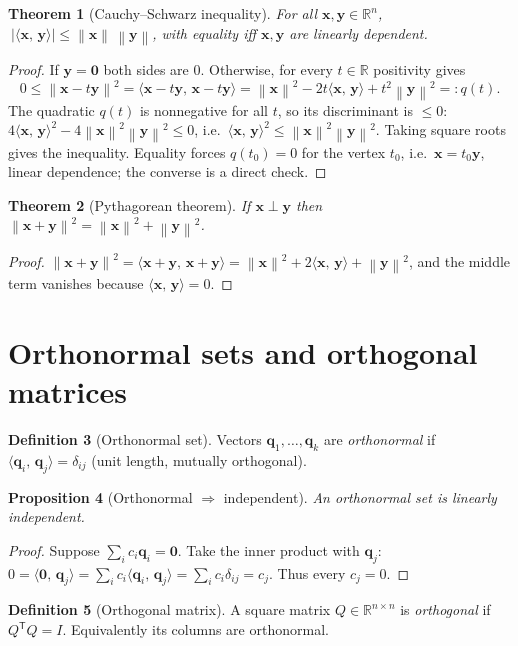 \documentclass[11pt,oneside]{book}
\theoremstyle{plain}
\newtheorem{theorem}{Theorem}[chapter]
\newtheorem{proposition}[theorem]{Proposition}
\theoremstyle{definition}
\newtheorem{definition}[theorem]{Definition}
\theoremstyle{remark}
\newcommand{\R}{\mathbb{R}}
\newcommand{\norm}[1]{\left\lVert #1 \right\rVert}
\newcommand{\T}{^{\mathsf T}}
\newcommand{\inner}[2]{\langle #1,\, #2\rangle}
\newcommand{\bx}{\mathbf{x}}
\newcommand{\by}{\mathbf{y}}
\newcommand{\bq}{\mathbf{q}}
\newcommand{\bzero}{\mathbf{0}}
\begin{document}
\begin{theorem}[Cauchy--Schwarz inequality]\label{thm:cs}
For all $\bx,\by\in\R^n$, $\ |\inner{\bx}{\by}|\le\norm{\bx}\,\norm{\by}$, with equality
iff $\bx,\by$ are linearly dependent.
\end{theorem}
\begin{proof}
If $\by=\bzero$ both sides are $0$. Otherwise, for every $t\in\R$ positivity gives
\[
0\le\norm{\bx-t\by}^2=\inner{\bx-t\by}{\bx-t\by}
=\norm{\bx}^2-2t\inner{\bx}{\by}+t^2\norm{\by}^2 =: q(t).
\]
The quadratic $q(t)$ is nonnegative for all $t$, so its discriminant is $\le0$:
$4\inner{\bx}{\by}^2-4\norm{\bx}^2\norm{\by}^2\le0$, i.e.\
$\inner{\bx}{\by}^2\le\norm{\bx}^2\norm{\by}^2$. Taking square roots gives the
inequality. Equality forces $q(t_0)=0$ for the vertex $t_0$, i.e.\ $\bx=t_0\by$,
linear dependence; the converse is a direct check.
\end{proof}

\begin{theorem}[Pythagorean theorem]\label{thm:pyth}
If $\bx\perp\by$ then $\norm{\bx+\by}^2=\norm{\bx}^2+\norm{\by}^2$.
\end{theorem}
\begin{proof}
$\norm{\bx+\by}^2=\inner{\bx+\by}{\bx+\by}=\norm{\bx}^2+2\inner{\bx}{\by}+\norm{\by}^2$,
and the middle term vanishes because $\inner{\bx}{\by}=0$.
\end{proof}

\section{Orthonormal sets and orthogonal matrices}

\begin{definition}[Orthonormal set]
Vectors $\bq_1,\dots,\bq_k$ are \emph{orthonormal} if $\inner{\bq_i}{\bq_j}=\delta_{ij}$
(unit length, mutually orthogonal).
\end{definition}

\begin{proposition}[Orthonormal $\Rightarrow$ independent]\label{prop:orthoindep}
An orthonormal set is linearly independent.
\end{proposition}
\begin{proof}
Suppose $\sum_i c_i\bq_i=\bzero$. Take the inner product with $\bq_j$:
$0=\inner{\bzero}{\bq_j}=\sum_i c_i\inner{\bq_i}{\bq_j}=\sum_i c_i\delta_{ij}=c_j$. Thus
every $c_j=0$.
\end{proof}

\begin{definition}[Orthogonal matrix]
A square matrix $Q\in\R^{n\times n}$ is \emph{orthogonal} if $Q\T Q=I$. Equivalently its
columns are orthonormal.
\end{definition}
\end{document}
